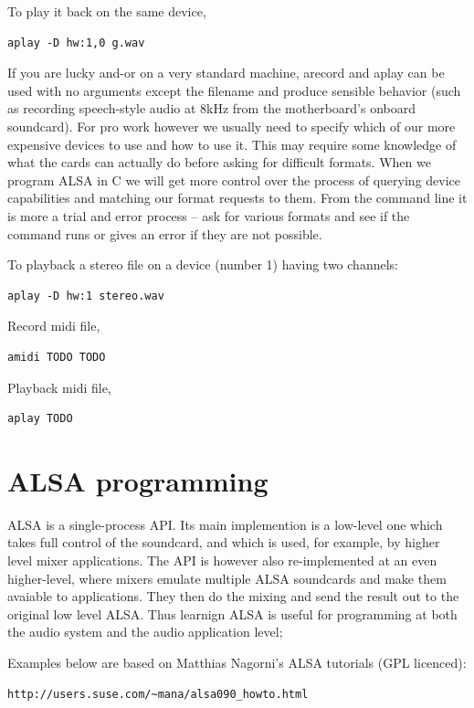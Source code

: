 \documentclass[oneside,english]{scrbook}
\begin{document}
To play it back on the same device,
\begin{lstlisting}
aplay -D hw:1,0 g.wav
\end{lstlisting}

If you are lucky and-or on a very standard machine, arecord and aplay can be used with no arguments except the filename and produce sensible behavior (such as recording speech-style audio at 8kHz from the motherboard's onboard soundcard). For pro work however we usually need to specify which of our more expensive devices to use and how to use it.  This may require some knowledge of what the cards can actually do before asking for difficult formats.  When we program ALSA in C we will get more control over the process of querying device capabilities and matching our format requests to them.  From the command line it is more a trial and error process -- ask for various formats and see if the command runs or gives an error if they are not possible.

To playback a stereo file on a device (number 1) having two channels:
\begin{lstlisting}
aplay -D hw:1 stereo.wav
\end{lstlisting}

Record midi file,
\begin{lstlisting}
amidi TODO TODO
\end{lstlisting}

Playback midi file,
\begin{lstlisting}
aplay TODO
\end{lstlisting}




\chapter{ALSA programming}

ALSA is a single-process API.  Its main implemention is a low-level one which takes full control of the soundcard, and which is used, for example, by higher level mixer applications.  The API is however also re-implemented at an even higher-level, where mixers emulate multiple ALSA soundcards and make them avaiable to applications.  They then do the mixing and send the result out to the original low level ALSA.  Thus learnign ALSA is useful for programming at both the audio system and the audio application level;

Examples below are based on Matthias Nagorni's ALSA tutorials (GPL licenced):
\begin{lstlisting}
http://users.suse.com/~mana/alsa090_howto.html
\end{lstlisting}
\end{document}
